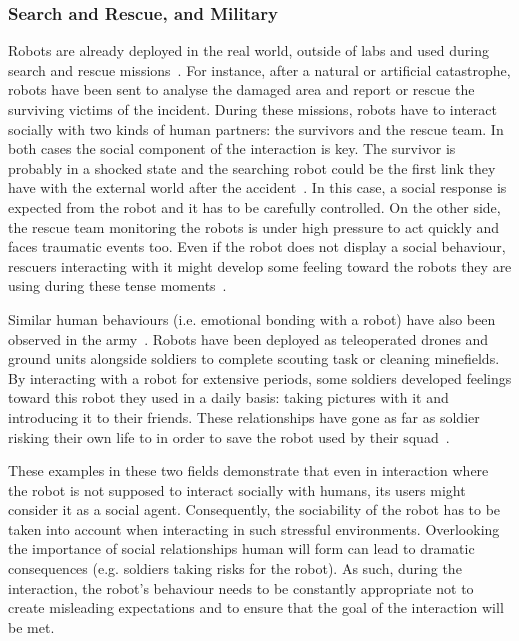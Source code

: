 \subsubsection{Search and Rescue, and Military} 
    Robots are already deployed in the real world, outside of labs and used during search and rescue missions~\citep{murphy2008search}. For instance, after a natural or artificial catastrophe, robots have been sent to analyse the damaged area and report or rescue the surviving victims of the incident. During these missions, robots have to interact socially with two kinds of human partners: the survivors and the rescue team. In both cases the social component of the interaction is key. The survivor is probably in a shocked state and the searching robot could be the first link they have with the external world after the accident~\citep{murphy2008search}. In this case, a social response is expected from the robot and it has to be carefully controlled. On the other side, the rescue team monitoring the robots is under high pressure to act quickly and faces traumatic events too. Even if the robot does not display a social behaviour, rescuers interacting with it might develop some feeling toward the robots they are using during these tense moments~\citep{fincannon2004evidence}.
	
    Similar human behaviours (i.e. emotional bonding with a robot) have also been observed in the army~\citep{singer2009wired}. Robots have been deployed as teleoperated drones and ground units alongside soldiers to complete scouting task or cleaning minefields. By interacting with a robot for extensive periods, some soldiers developed feelings toward this robot they used in a daily basis: taking pictures with it and introducing it to their friends. These relationships have gone as far as soldier risking their own life to in order to save the robot used by their squad~\citep{singer2009wired}. 
    
    These examples in these two fields demonstrate that even in interaction where the robot is not supposed to interact socially with humans, its users might consider it as a social agent. Consequently, the sociability of the robot has to be taken into account when interacting in such stressful environments. Overlooking the importance of social relationships human will form can lead to dramatic consequences (e.g. soldiers taking risks for the robot). As such, during the interaction, the robot's behaviour needs to be constantly appropriate not to create misleading expectations and to ensure that the goal of the interaction will be met.
		
